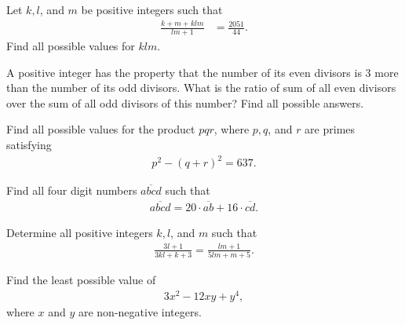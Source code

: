 \documentclass[problems.tex]{subfile}
\begin{document}
	\begin{problem}
		Let $k, l$, and $m$ be positive integers such that
		\begin{align*}
			\frac{k+m+klm}{lm+1} &= \frac{2051}{44}.
		\end{align*}
		Find all possible values for $klm$.
	\end{problem}
	
	
	\begin{problem}
		A positive integer has the property that the number of its even divisors is $3$ more than the number of its odd divisors. What is the ratio of sum of all even divisors over the sum of all odd divisors of this number? Find all possible answers.
	\end{problem}
	
	
	
	\begin{problem}
		Find all possible values for the product $pqr$, where $p, q$, and $r$ are primes satisfying
		\begin{align*}
			p^2 - (q+r)^2 = 637.
		\end{align*}
	\end{problem}
	
	
	\begin{problem}
		Find all four digit numbers $\overline{abcd}$ such that
		\begin{align*}
			\overline{abcd} = 20 \cdot \overline{ab} + 16 \cdot \overline{cd}.
		\end{align*}
	\end{problem}
	
	
	
	\begin{problem}
		Determine all positive integers $k,l$, and $m$ such that
		\begin{align*}
			\frac{3l+1}{3kl+k+3} = \frac{lm + 1}{5lm+m+5}.
		\end{align*}
	\end{problem}
	
	
	\begin{problem}
		Find the least possible value of
		\begin{align*}
			3x^2 - 12xy + y^4,
		\end{align*}
		where $x$ and $y$ are non-negative integers.
	\end{problem}
	
\end{document}

